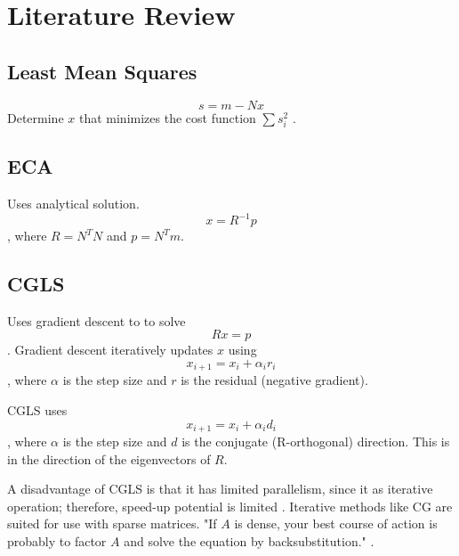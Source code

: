 \chapter{Literature Review}

\section{Least Mean Squares}

\[s=m-Nx\]
Determine $x$ that minimizes the cost function \(\sum{s_i^2}\) .


\section{ECA}

Uses analytical solution.
\[x=R^{-1}p\], where $R=N^TN$ and $p=N^Tm$.

\section{CGLS}
Uses gradient descent to to solve 
\[Rx=p\]
. Gradient descent iteratively updates $x$ using 
\[x_{i+1} = x_i + \alpha_i r_i\], where $\alpha$ is the step size and $r$ is the residual (negative gradient).

CGLS uses \[x_{i+1} = x_i + \alpha_i d_i\], where $\alpha$ is the step size and $d$ is the conjugate (R-orthogonal) direction. This is in the direction of the eigenvectors of $R$.


A disadvantage of CGLS is that it has limited parallelism, since it as iterative operation; therefore, speed-up potential is limited \cite{Hicks}. Iterative methods like CG are suited for use with sparse matrices. "If $A$ is dense, your best course of action is probably to factor $A$ and solve the equation by backsubstitution." \cite{Painless-CG}.

 